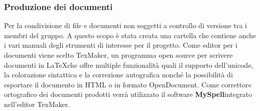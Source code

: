\documentclass[a4paper,11pt]{article}
\begin{document}
	\subsubsection{Produzione dei documenti} \label{doc:prodoc}
	
	Per la condivisione di file e documenti non soggetti a controllo di versione tra i membri del gruppo. A questo scopo è stata creata una cartella che contiene anche i vari  manuali degli strumenti di interesse per il progetto.
	Come editor per i documenti viene scelto TexMaker\addglos, un programma open source per scrivere documenti in \LaTeX   che offre multiple funzionalità quali il supporto dell'unicode, la colorazione sintattica e la correzione autografica nonché la possibilità di esportare il documento in HTML o in formato OpenDocument\addglos.
	Come correttore ortografico dei documenti prodotti verrà utilizzato il software \textbf{MySpell}\addglos integrato nell'editor TexMaker.
	\newpage
	
		
	
\end{document}

